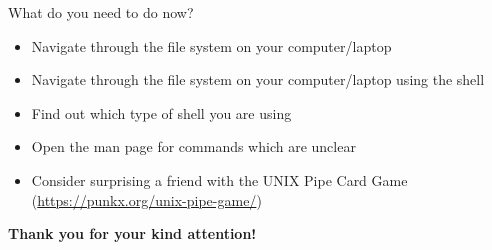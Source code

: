 \documentclass[hyperref={pdfpagelabels=false},aspectratio=169]{beamer}
\begin{document}
\begin{frame}{What do you need to do now?}

    \begin{itemize}
        \item Navigate through the file system on your computer/laptop
        \item Navigate through the file system on your computer/laptop using the shell
        \item Find out which type of shell you are using
        \item Open the man page for commands which are unclear
        \item Consider surprising a friend with the UNIX Pipe Card Game (\url{https://punkx.org/unix-pipe-game/})
    \end{itemize}
    
    \vspace{20pt}
    \centering
    \normalsize
    \textbf{Thank you for your kind attention!}
\end{frame}
\end{document}
